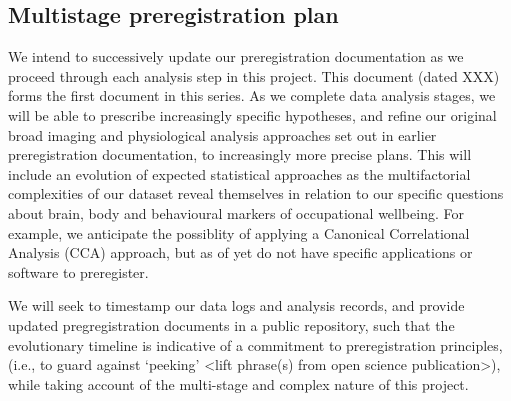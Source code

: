 \documentclass[
  english,
  man,draftall]{apa6}
\begin{document}
\hspace{1cm}

\hypertarget{multistage-preregistration-plan}{%
\subsection{Multistage preregistration plan}\label{multistage-preregistration-plan}}

We intend to successively update our preregistration documentation as we proceed through each analysis step in this project. This document (dated XXX) forms the first document in this series. As we complete data analysis stages, we will be able to prescribe increasingly specific hypotheses, and refine our original broad imaging and physiological analysis approaches set out in earlier preregistration documentation, to increasingly more precise plans. This will include an evolution of expected statistical approaches as the multifactorial complexities of our dataset reveal themselves in relation to our specific questions about brain, body and behavioural markers of occupational wellbeing. For example, we anticipate the possiblity of applying a Canonical Correlational Analysis (CCA) approach, but as of yet do not have specific applications or software to preregister.

We will seek to timestamp our data logs and analysis records, and provide updated pregregistration documents in a public repository, such that the evolutionary timeline is indicative of a commitment to preregistration principles, (i.e., to guard against `peeking' \textless lift phrase(s) from open science publication\textgreater), while taking account of the multi-stage and complex nature of this project.

\newpage

\newpage
\end{document}
